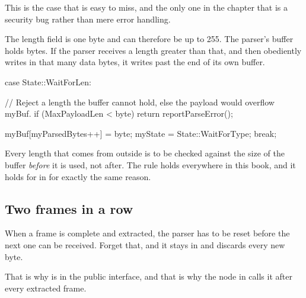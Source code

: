 This is the case that is easy to miss, and the only one in the chapter that is a security bug
rather than mere error handling.

The length field is one byte and can therefore be up to 255. The parser's buffer holds
 bytes. If the parser receives a length greater than that, and then
obediently writes in that many data bytes, it writes past the end of its own buffer.

\begin{cppcode}
case State::WaitForLen:
{
    // Reject a length the buffer cannot hold, else the payload would overflow myBuf.
    if (MaxPayloadLen < byte) { return reportParseError(); }

    myBuf[myParsedBytes++] = byte;
    myState                = State::WaitForType;
    break;
}
\end{cppcode}

\begin{aside}
\note[Rule] Every length that comes from outside is to be checked against the size of the buffer
\emph{before} it is used, not after. The rule holds everywhere in this book, and it holds for
 in  for exactly the same reason.
\end{aside}

\subsection{Two frames in a row}

When a frame is complete and extracted, the parser has to be reset before the next one can be
received. Forget that, and it stays in  and discards every new byte.

That is why  is in the public interface, and that is why the node in
 calls it after every extracted frame.
